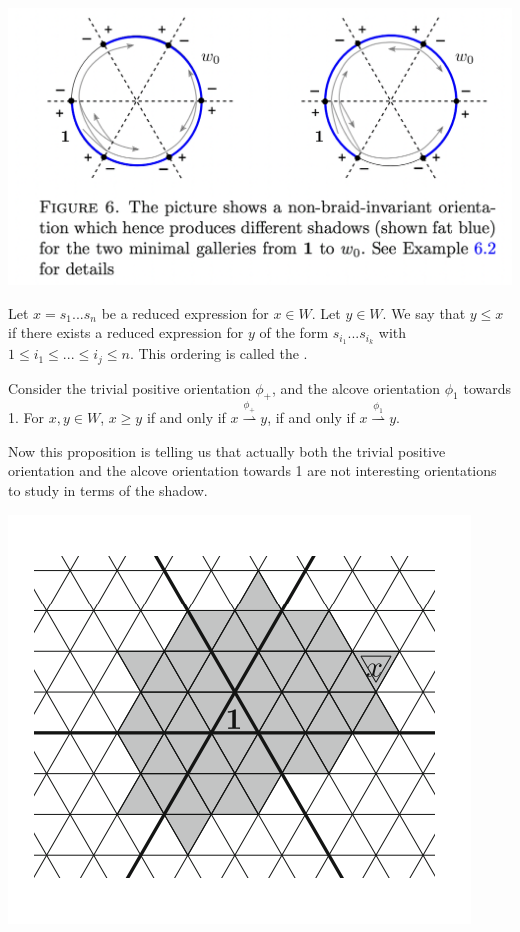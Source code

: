 \documentclass[11pt]{article}
\begin{document}
\begin{center}
\includegraphics[scale=0.6]{Screenshot 2023-02-08 at 10.39.18.png}\\
\end{center}
\begin{definition}
    Let $x=s_1...s_n$ be a reduced expression for $x\in W$. Let $y\in W$. We say that $y\leq x$ if there exists a reduced expression for $y$ of the form $s_{i_1}...s_{i_k}$ with $1\leq i_1\leq...\leq i_j\leq n$. This ordering is called the .
\end{definition}

\begin{proposition}
    Consider the trivial positive orientation $\phi_+$, and the alcove orientation $\phi_1$ towards 1. For $x,y\in W$, $x\geq y$ if and only if $x\stackrel{\phi_+}{\rightharpoonup} y$, if and only if $x\stackrel{\phi_1}{\rightharpoonup} y$.
\end{proposition}

Now this proposition is telling us that actually both the trivial positive orientation and the alcove orientation towards 1 are not interesting orientations to study in terms of the shadow. 

\begin{center}
    \includegraphics[scale=0.7]{Screenshot 2023-03-07 133912.png}\\
\end{center}
\end{document}
